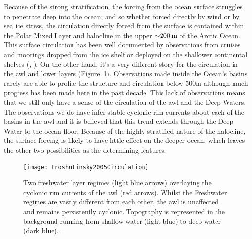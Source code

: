 \documentclass[10pt,a4paper]{article}
\begin{document}
Because of the strong stratification, the forcing from the ocean surface 
struggles to penetrate deep into the ocean; and so whether forced directly by wind 
or by sea ice stress, the circulation
directly forced from the surface is contained within the Polar Mixed Layer 
and halocline in the upper ${\sim}200\,{\rm m}$ of the Arctic Ocean. 
This surface circulation has been well documented by observations
from cruises and moorings  dropped  from  the  ice  shelf  or  deployed  on 
the  shallower  continental  shelves (\cite{gerdes1997large}, \cite{jones2001circulation}). On the other hand, it's a very different
story for the circulation in the \gls{awl} and lower layers (Figure~\ref{fig:Proshutinsky2005Circulation}). Observations made
inside the Ocean's basins rarely are able to profile the structure  and
circulation  below 500m  although much progress has been made here in the
past decade. This lack of observations means that  we  still only have  a  sense  of  the circulation 
of the \gls{awl} and the Deep  Waters.  The  observations  we  do 
have  infer stable cyclonic  rim  currents about each of the basins in the
\gls{awl} and it is believed that this trend extends through the Deep Water to the 
ocean floor.  Because of the highly stratified nature of the halocline, the surface forcing 
is likely to have little effect on the deeper ocean, which leaves the other 
two possibilities as the determining features.


\begin{figure}
	\centering
	\texttt{[image: Proshutinsky2005Circulation]}
	\caption[\cite{proshutinsky2005arctic}]{ Two freshwater layer regimes (light 
		blue arrows) overlaying the cyclonic rim currents of the \gls{awl} (red arrows).
		Whilst the Freshwater regimes are vastly different from each other, the
		\gls{awl} is unaffected and remains persistently cyclonic.
		Topography is represented in the background running from 
		shallow water (light blue) to deep water (dark blue).  \cite{proshutinsky2005arctic}.}
	\label{fig:Proshutinsky2005Circulation}
\end{figure}
\end{document}
